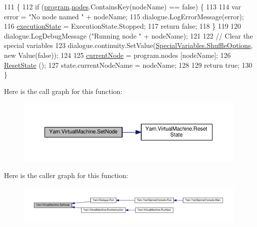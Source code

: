 \begin{DoxyCode}
111                                              \{
112             \textcolor{keywordflow}{if} (\hyperlink{a00152_a2695dbfe3d9df7ffa3f13ad2231217fb}{program}.\hyperlink{a00142_a3f4928a577c88263ad016be259b175c4}{nodes}.ContainsKey(nodeName) == \textcolor{keyword}{false}) \{
113 
114                 var error = \textcolor{stringliteral}{"No node named "} + nodeName;
115                 dialogue.LogErrorMessage(error);
116                 \hyperlink{a00152_a66491da06023dabfb63d09e6ccbba74f}{executionState} = ExecutionState.Stopped;
117                 \textcolor{keywordflow}{return} \textcolor{keyword}{false};
118             \}
119 
120             dialogue.LogDebugMessage (\textcolor{stringliteral}{"Running node "} + nodeName);
121 
122             \textcolor{comment}{// Clear the special variables}
123             dialogue.continuity.SetValue(\hyperlink{a00152_aecbb8ab9becd96457d836100b2818078}{SpecialVariables.ShuffleOptions}, \textcolor{keyword}{
      new} Value(\textcolor{keyword}{false}));
124 
125             \hyperlink{a00152_ab7594e14981ad75cecea3b2e7dcf895c}{currentNode} = program.nodes [nodeName];
126             \hyperlink{a00152_a3ba945c66cb8ba031357a1771453f82b}{ResetState} ();
127             state.currentNodeName = nodeName;
128 
129             \textcolor{keywordflow}{return} \textcolor{keyword}{true};
130         \}
\end{DoxyCode}


Here is the call graph for this function\-:
\nopagebreak
\begin{figure}[H]
\begin{center}
\leavevmode
\includegraphics[width=350pt]{a00152_a6364593ea1115d65e34b343422cfbbbd_cgraph}
\end{center}
\end{figure}




Here is the caller graph for this function\-:
\nopagebreak
\begin{figure}[H]
\begin{center}
\leavevmode
\includegraphics[width=350pt]{a00152_a6364593ea1115d65e34b343422cfbbbd_icgraph}
\end{center}
\end{figure}


